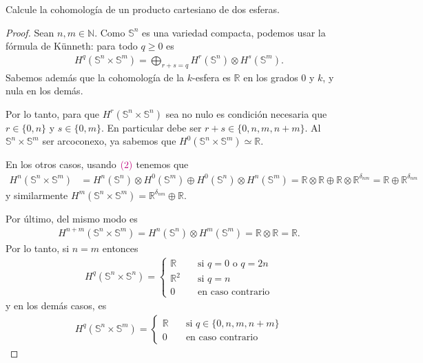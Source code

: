 \documentclass[11pt]{article}
\newcommand{\N}{\mathbb{N}}
\newcommand{\R}{\mathbb{R}}
\newcommand{\Ss}{\mathbb{S}}
\newcommand{\paint}[1]{\color{color}{#1}}
\newenvironment{exercise}[2][Ejercicio]{\begin{trivlist}
\item[\hskip \labelsep \paint{{\bfseries #1}}\hskip \labelsep {\bfseries #2.}]}{\end{trivlist}}
\begin{document}
\begin{exercise}{11 (d)} Calcule la cohomología de un producto cartesiano de dos esferas.
\end{exercise}
\begin{proof} Sean $n,m \in \N$. Como $\Ss^n$ es una variedad compacta, podemos usar la fórmula de Künneth: para todo $q \geq 0$ es 
\begin{align}
H^q(\Ss^n \times \Ss^m) = \bigoplus_{r+s = q} H^r(\Ss^n) \otimes H^s(\Ss^m).
\end{align}
Sabemos además que la cohomología de la $k$-esfera es $\R$ en los grados $0$ y $k$, y nula en los demás.

Por lo tanto, para que $H^r(\Ss^n \times \Ss^n)$ sea no nulo es condición necesaria que $r\in \{0,n\}$ y $s \in \{0,m\}$. En particular debe ser $r+s \in \{0,n,m,n+m\}$. Al $\Ss^n \times  \Ss^m$ ser arcoconexo, ya sabemos que $H^0(\Ss^n \times \Ss^m) \simeq \R$. 

En los otros casos, usando $\paint{(2)}$ tenemos que
\begin{align*}
H^n(\Ss^n \times \Ss^m) &= H^n(\Ss^n) \otimes H^0(\Ss^m) \oplus H^0(\Ss^n) \otimes H^n(\Ss^m) = \R \otimes \R \oplus \R \otimes \R^{\delta_{nm}} = \R \oplus \R^{\delta_{nm}}
\end{align*}
y similarmente $H^m(\Ss^n \times \Ss^m) = \R^{\delta_{nm}} \oplus \R$. 

Por último, del mismo modo es 
\begin{align*}
H^{n+m}(\Ss^n \times \Ss^m) = H^n(\Ss^n) \otimes H^m(\Ss^m) = \R \otimes \R = \R.
\end{align*}
Por lo tanto, si $n = m$ entonces
\begin{align*}
H^q(\Ss^n \times \Ss^n) = \begin{cases}
\R \quad &\text{si $q = 0$ o $q = 2n$}\\
\R^2 \quad &\text{si $q = n$}\\
0 \quad &\text{en caso contrario}
\end{cases}
\end{align*}
y en los demás casos, es
\begin{align*}
H^q(\Ss^n \times \Ss^m) = \begin{cases}
\R \quad &\text{si $q \in \{0,n,m,n+m\}$}\\
0 \quad &\text{en caso contrario}
\end{cases}
\end{align*}
\end{proof}
\end{document}
